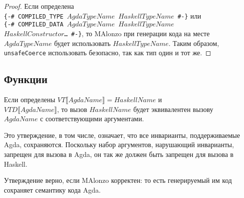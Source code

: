 \begin{proof}
Если определена\\ \texttt{\{-\# COMPILED\_TYPE \(AgdaTypeName\) \(HaskellTypeName\) \#-\}}
или\\ \texttt{\{-\# COMPILED\_DATA \(AgdaTypeName\) \(HaskellTypeName\)\\
\(HaskellConstructor\)\dots\ \#-\}},
то MAlonzo при генерации кода на месте\\ \(AgdaTypeName\) будет использовать
\(HaskellTypeName\). Таким образом,\\ \texttt{unsafeCoerce}
использовать безопасно, так как тип один и тот же.
\end{proof}

\subsection{Функции}

\begin{thm}
Если определены \(VT\llbracket AgdaName \rrbracket = HaskellName\) и\\
\(VTD\llbracket AgdaName \rrbracket\), то вызов \(HaskellName\) будет
эквивалентен вызову \\\(AgdaName\) с соответствующими аргументами.
\end{thm}

Это утверждение, в том числе, означает, что все инварианты, поддерживаемые Agda,
сохраняются. Поскольку набор аргументов, нарушающий инварианты, запрещен для вызова
в Agda, он так же должен быть запрещен для вызова в Haskell.

Утверждение верно, если MAlonzo корректен: то есть генерируемый им код сохраняет семантику
кода Agda.

